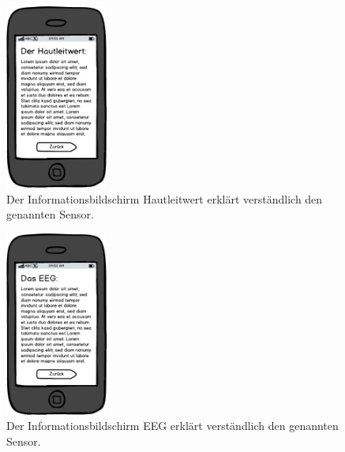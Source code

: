 \documentclass[10pt, a4paper, oneside, titlepage]{scrartcl} %
\begin{document}
	\begin{figure}[ht!]
		\begin{center}
			\includegraphics[width=0.3\textwidth]{mockup_11_skinconductance.png}
		\end{center}
		\caption[Mockup Infobildschirm Hautleitwert]{Der Informationsbildschirm Hautleitwert erklärt verständlich den genannten Sensor.}
		\label{fig:mockup_11}
	\end{figure}	

	\begin{figure}[ht!]
		\begin{center}
			\includegraphics[width=0.3\textwidth]{mockup_12_eeg.png}
		\end{center}
		\caption[Mockup Infobildschirm EEG]{Der Informationsbildschirm EEG erklärt verständlich den genannten Sensor.}
		\label{fig:mockup_12}
	\end{figure}	
\end{document}
